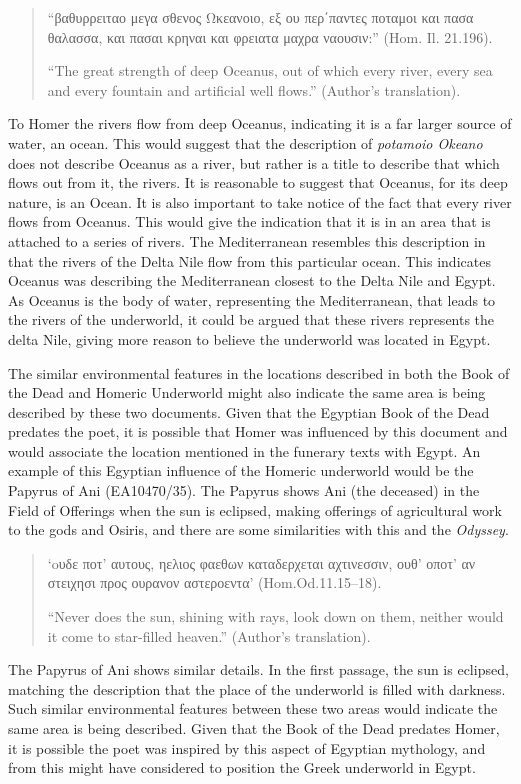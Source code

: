 	\begin{quote}
		
	“βαθυρρειταο μεγα σθενος Ωκεανοιο,
	εξ ου περ΄παντες ποταμοι και πασα θαλασσα,
	και πασαι κρηναι και φρειατα μαχρα ναουσιν:” (Hom. Il. 21.196).
		
	“The great strength of deep Oceanus, out of which every river, every sea and every fountain and artificial well flows.” (Author’s translation).
	
	\end{quote}
To Homer the rivers flow from deep Oceanus, indicating it is a far larger source of water, an ocean. This would suggest that the description of \emph{potamoio Okeano} does not describe Oceanus as a river, but rather is a title to describe that which flows out from it, the rivers. It is reasonable to suggest that Oceanus, for its deep nature, is an Ocean. It is also important to take notice of the fact that every river flows from Oceanus. This would give the indication that it is in an area that is attached to a series of rivers. The Mediterranean resembles this description in that the rivers of the Delta Nile flow from this particular ocean. This indicates Oceanus was describing the Mediterranean closest to the Delta Nile and Egypt. As Oceanus is the body of water, representing the Mediterranean, that leads to the rivers of the underworld, it could be argued that these rivers represents the delta Nile, giving more reason to believe the underworld was located in Egypt. 
		
	The similar environmental features in the locations described in both the Book of the Dead and Homeric Underworld might also indicate the same area is being described by these two documents. Given that the Egyptian Book of the Dead predates the poet, it is possible that Homer was influenced by this document and would associate the location mentioned in the funerary texts with Egypt. An example of this Egyptian influence of the Homeric underworld would be the Papyrus of Ani (EA10470/35). The Papyrus shows Ani (the deceased) in the Field of Offerings when the sun is eclipsed, making offerings of agricultural work to the gods and Osiris, and there are some similarities with this and the \emph{Odyssey}. 
	
	\begin{quote}
		
	‘oυδε ποτ’ αυτους, 
	ηελιος φαεθων καταδερχεται αχτινεσσιν, 
	ουθ’ οποτ’ αν στειχησι προς ουρανον αστεροεντα’ (Hom.Od.11.15–18).
		
	“Never does the sun, shining with rays, look down on them, neither would it come to star-filled heaven.” (Author’s translation).
	
	\end{quote}
		The Papyrus of Ani shows similar details. In the first passage, the sun is eclipsed, matching the description that the place of the underworld is filled with darkness. Such similar environmental features between these two areas would indicate the same area is being described. Given that the Book of the Dead predates Homer, it is possible the poet was inspired by this aspect of Egyptian mythology, and from this might have considered to position the Greek underworld in Egypt.  
	
